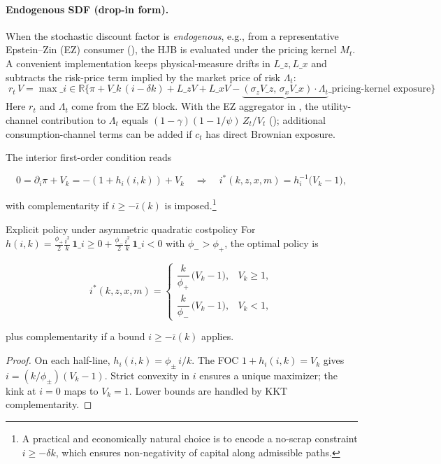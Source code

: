﻿\documentclass[11pt,letterpaper,oneside]{article}
\numberwithin{equation}{section}
\newcommand{\R}{\mathbb{R}}
\newcommand{\1}{\mathbf{1}}
\newcommand{\Lz}{L\_z}
\newcommand{\Lx}{L\_x}
\newcommand{\ind}[1]{\mathbf{1}\_{{#1}}}
\newcommand{\kbar}{\bar\iota}
\begin{document}
\paragraph{Endogenous SDF (drop-in form).}
When the stochastic discount factor is \emph{endogenous}, e.g., from a representative Epstein--Zin (EZ) consumer (), the HJB is evaluated under the pricing kernel $M_t$. A convenient implementation keeps physical-measure drifts in $\Lz,\Lx$ and subtracts the risk-price term implied by the market price of risk $\Lambda_t$:
\begin{equation}\label{eq:HJB-EZ}
\boxed{\; r_t\,V 
  = \max\_{i\in\R} \Big\{ \pi + V\_k\,(i-\delta k) + \Lz V + \Lx V 
      - \underbrace{(\sigma_z V\_z,\, \sigma_x V\_x)\cdot\Lambda_t}\_{\text{pricing-kernel exposure}} \Big\} \;}
\end{equation}
Here $r_t$ and $\Lambda_t$ come from the EZ block. With the EZ aggregator in , the utility-channel contribution to $\Lambda_t$ equals $(1-\gamma)(1-1/\psi)\,Z_t/V_t$ (); additional consumption-channel terms can be added if $c_t$ has direct Brownian exposure.

The interior first-order condition reads

$$
0=\partial_i\pi+V_k=-(1+h_i(i,k))+V_k
\quad\Longrightarrow\quad
i^*(k,z,x,m)=h_i^{-1}\!\big(V_k-1\big),
$$

with complementarity if $i\ge -\kbar(k)$ is imposed.\footnote{A practical and economically natural choice is to encode a no-scrap constraint $i\ge -\delta k$, which ensures non-negativity of capital along admissible paths.}

\begin{proposition}{Explicit policy under asymmetric quadratic cost}{policy}
For
$h(i,k)=\tfrac{\phi_+}{2}\tfrac{i^2}{k}\,\ind{i\ge 0}
+\tfrac{\phi_-}{2}\tfrac{i^2}{k}\,\ind{i<0}$
with $\phi_->\phi_+$, the optimal policy is

$$
i^*(k,z,x,m)=
\begin{cases}
\dfrac{k}{\phi_+}\,\big(V_k-1\big), & V_k\ge 1,\\[6pt]
\dfrac{k}{\phi_-}\,\big(V_k-1\big), & V_k< 1,
\end{cases}
$$

plus complementarity if a bound $i\ge -\kbar(k)$ applies.
\end{proposition}
\begin{proof}
On each half-line, $h_i(i,k)=\phi_\pm\,i/k$. The FOC $1+h_i(i,k)=V_k$ gives $i=(k/\phi_\pm)(V_k-1)$. Strict convexity in $i$ ensures a unique maximizer; the kink at $i=0$ maps to $V_k=1$. Lower bounds are handled by KKT complementarity.
\end{proof}
\end{document}
